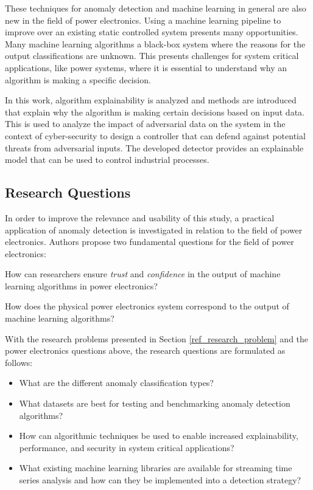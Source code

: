 These techniques for anomaly detection and machine learning in general are also new in the field of power electronics.
Using a machine learning pipeline to improve over an existing static controlled system presents many opportunities.
Many machine learning algorithms a black-box system where the reasons for the output classifications are unknown.
This presents challenges for system critical applications, like power systems, where it is essential to understand why an algorithm is making a specific decision.

In this work, algorithm explainability is analyzed and methods are introduced that explain why the algorithm is making certain decisions based on input data.
This is used to analyze the impact of adversarial data on the system in the context of cyber-security to design a controller that can defend against potential threats from adversarial inputs.
The developed detector provides an explainable model that can be used to control industrial processes.

\subsection{Research Questions}

In order to improve the relevance and usability of this study, a practical application of anomaly detection is investigated in relation to the field of power electronics.
Authors \cite{black-box-explainability} propose two fundamental questions for the field of power electronics:
\begin{inlinelist}
    \item How can researchers ensure \textit{trust} and \textit{confidence} in the output of machine learning algorithms in power electronics?
    \item How does the physical power electronics system correspond to the output of machine learning algorithms?
\end{inlinelist}

With the research problems presented in Section \ref{ref_research_problem} and the power electronics questions above, the research questions are formulated as follows:
\begin{itemize}
    \item What are the different anomaly classification types?
    \item What datasets are best for testing and benchmarking anomaly detection algorithms?
    \item How can algorithmic techniques be used to enable increased explainability, performance, and security in system critical applications?
    \item What existing machine learning libraries are available for streaming time series analysis and how can they be implemented into a detection strategy?
\end{itemize}

